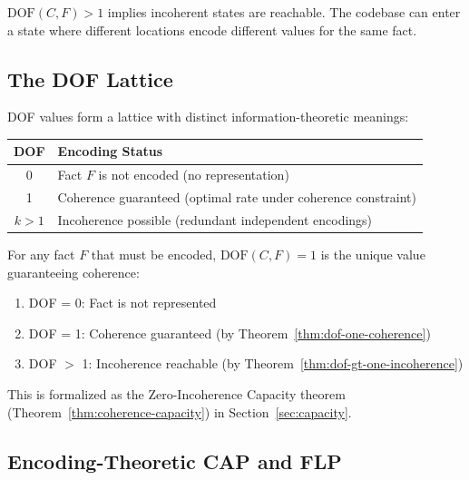 \begin{corollary}\label{cor:dof-risk}
$\text{DOF}(C, F) > 1$ implies incoherent states are reachable. The codebase can enter a state where different locations encode different values for the same fact.
\end{corollary}

\subsection{The DOF Lattice}\label{sec:dof-lattice}

DOF values form a lattice with distinct information-theoretic meanings:

\begin{center}
\begin{tabularx}{\linewidth}{cX}
\toprule
\textbf{DOF} & \textbf{Encoding Status} \\
\midrule
0 & Fact $F$ is not encoded (no representation) \\
1 & Coherence guaranteed (optimal rate under coherence constraint) \\
$k > 1$ & Incoherence possible (redundant independent encodings) \\
\bottomrule
\end{tabularx}
\end{center}

\begin{theorem}[DOF = 1 is Uniquely Coherent]\label{thm:dof-optimal}
For any fact $F$ that must be encoded, $\text{DOF}(C, F) = 1$ is the unique value guaranteeing coherence:
\begin{enumerate}
\tightlist
\item DOF = 0: Fact is not represented
\item DOF = 1: Coherence guaranteed (by Theorem~\ref{thm:dof-one-coherence})
\item DOF $>$ 1: Incoherence reachable (by Theorem~\ref{thm:dof-gt-one-incoherence})
\end{enumerate}
This is formalized as the Zero-Incoherence Capacity theorem (Theorem~\ref{thm:coherence-capacity}) in Section~\ref{sec:capacity}.
\end{theorem}

\subsection{Encoding-Theoretic CAP and FLP}\label{sec:cap-flp}


